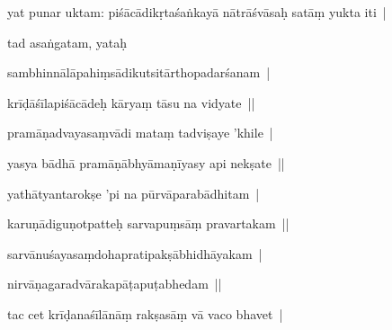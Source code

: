 \documentclass[article,12pt,a4paper]{memoir}%
\newcounter{parCount}
\begin{document}
	  \pstart \leavevmode%
	yat punar uktam: piśācādikṛtaśaṅkayā nātrāśvāsaḥ satāṃ yukta iti | 
	{}
	\pend%
      

	  \pstart \leavevmode%
	tad asaṅgatam, yataḥ 
	{}
	\pend%
      

	  \pstart \leavevmode%
	sambhinnālāpahiṃsādikutsitārthopadarśanam | 
	{}
	\pend%
      

	  \pstart \leavevmode%
	krīḍāśīlapiśācādeḥ kāryaṃ tāsu na vidyate || 
	{}
	\pend%
      

	  \pstart \leavevmode%
	pramāṇadvayasaṃvādi mataṃ tadviṣaye 'khile | 
	{}
	\pend%
      

	  \pstart \leavevmode%
	yasya bādhā pramāṇābhyāmaṇīyasy api nekṣate || 
	{}
	\pend%
      

	  \pstart \leavevmode%
	yathātyantarokṣe 'pi na pūrvāparabādhitam | 
	{}
	\pend%
      

	  \pstart \leavevmode%
	karuṇādiguṇotpatteḥ sarvapuṃsāṃ pravartakam || 
	{}
	\pend%
      

	  \pstart \leavevmode%
	sarvānuśayasaṃdohapratipakṣābhidhāyakam | 
	{}
	\pend%
      

	  \pstart \leavevmode%
	nirvāṇagaradvārakapāṭapuṭabhedam || 
	{}
	\pend%
      

	  \pstart \leavevmode%
	tac cet krīḍanaśīlānāṃ rakṣasāṃ vā vaco bhavet | 
	{}
	\pend%
      
\end{document}
